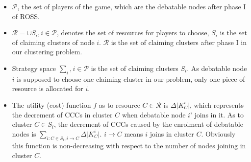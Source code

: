 \documentclass[10pt,journal,compsoc]{IEEEtran}
\theoremstyle{mytheoremstyle}
\theoremstyle{mytheoremstyle}
\theoremstyle{mytheoremstyle}
\begin{document}

\begin{itemize}
	\item $\mathcal{P}$, the set of players of the game, which are the debatable nodes after phase I of ROSS.
	\item $\mathcal{R} = \cup S_i, i\in \mathcal{P}$, denotes the set of resources for players to choose, $S_i$ is the set of claiming clusters of node $i$. 
	$\mathcal{R}$ is the set of claiming clusters after phase I in our clustering problem.
	\item Strategy space $\sum_i, i \in \mathcal{P}$ is the set of claiming clusters $S_i$.
	As debatable node $i$ is supposed to choose one claiming cluster in our problem, only one piece of resource is allocated for $i$.%
	
	
	\item %
	The utility (cost) function $f$ as to resource $C\in \mathcal{R}$ is $\Delta\vert K^i_C \vert$, which represents the decrement of CCCs in cluster $C$ when debatable node $i$' joins in it.
	As to cluster $C\in S_i$, the decrement of CCCs caused by the enrolment of debatable nodes is $\sum_{i:C\in S_i, i\rightarrow C} \Delta\vert K^i_C \vert$. 
$i\rightarrow C$ means $i$ joins in cluster $C$.
Obviously this function is non-decreasing with respect to the number of nodes joining in cluster $C$.
	

\end{itemize}
\end{document}
